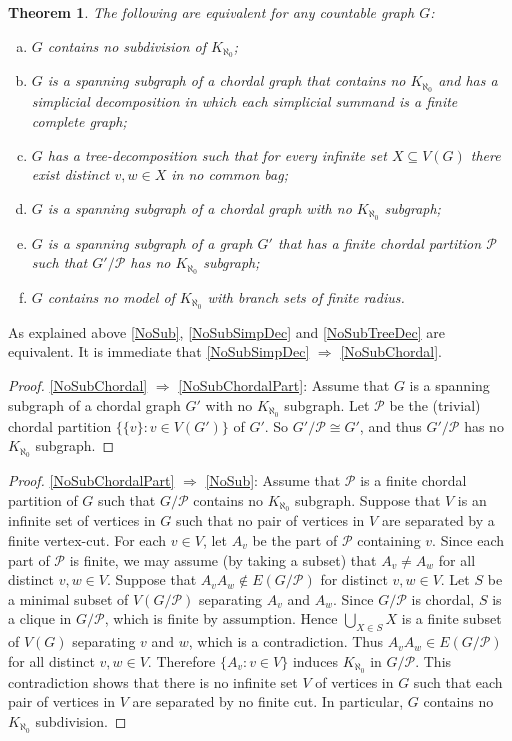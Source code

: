 \documentclass[a4paper,11pt]{article}
\theoremstyle{plain}
\newtheorem{thm}{Theorem}[section]
\theoremstyle{definition}
\newcommand{\PART}{\mathcal{P}}
\begin{document}
\begin{thm}
\label{InfiniteCompleteSubdivision}
The following are equivalent for any countable graph $G$:
\begin{enumerate}[(a)]
\item\label{NoSub} $G$ contains no subdivision of $K_{\aleph_0}$;
\item\label{NoSubSimpDec} $G$ is a spanning subgraph of a chordal graph that contains no $K_{\aleph_0}$ and has a simplicial decomposition in which each simplicial summand is a finite complete graph;
\item\label{NoSubTreeDec} $G$ has a tree-decomposition such that for every infinite set $X\subseteq V(G)$ there exist distinct $v,w\in X$ in no common bag;
\item\label{NoSubChordal} $G$ is a spanning subgraph of a chordal graph with no $K_{\aleph_0}$ subgraph;
\item\label{NoSubChordalPart} $G$ is a spanning subgraph of a graph $G'$ that has a finite chordal partition $\PART$ such that $G'/\PART$ has no $K_{\aleph_0}$ subgraph;
\item\label{NoSubModel} $G$ contains no model of $K_{\aleph_0}$ with branch sets of finite radius.
\end{enumerate}
\end{thm}

As explained above \cref{NoSub}, \cref{NoSubSimpDec} and  \cref{NoSubTreeDec} are equivalent. It is immediate that \cref{NoSubSimpDec} $\Longrightarrow$ \cref{NoSubChordal}. 

\begin{proof}
\cref{NoSubChordal} $\Longrightarrow$ \cref{NoSubChordalPart}:
Assume that $G$ is a spanning subgraph of a chordal graph $G'$ with no $K_{\aleph_0}$ subgraph. Let $\PART$ be the (trivial) chordal partition $\{\{v\}:v\in V(G')\}$ of $G'$. So $G'/\PART\cong G'$, and thus $G'/\PART$ has no $K_{\aleph_0}$ subgraph.
\end{proof}

\begin{proof}
\cref{NoSubChordalPart} $\Longrightarrow$ \cref{NoSub}: Assume that $\PART$ is a finite chordal partition of $G$ such that $G/\PART$ contains no $K_{\aleph_0}$ subgraph. Suppose that $V$ is an infinite set of vertices in $G$ such that no  pair of vertices in $V$ are separated by a finite vertex-cut. For each $v\in V$, let $A_v$ be the part of $\PART$ containing $v$. Since each part of $\PART$ is finite, we may assume (by taking a subset) that $A_v\neq A_w$ for all distinct $v,w\in V$. Suppose that $A_vA_w\notin E(G/\PART)$ for distinct $v,w\in V$. Let $S$ be a minimal subset of $V(G/\PART)$ separating $A_v$ and $A_w$. Since $G/\PART$ is chordal, $S$ is a clique in $G/\PART$, which is finite by assumption. Hence $\bigcup_{X\in S} X$ is a finite subset of $V(G)$ separating $v$ and $w$, which is a contradiction. Thus $A_vA_w\in E(G/\PART)$ for all distinct $v,w\in V$. Therefore $\{A_v:v\in V\}$ induces $K_{\aleph_0}$ in $G/\PART$. This contradiction shows that there is no infinite set $V$ of vertices in $G$ such that each pair of vertices in $V$ are separated by no finite cut. In particular, $G$ contains no $K_{\aleph_0}$ subdivision. 
\end{proof}
\end{document}

